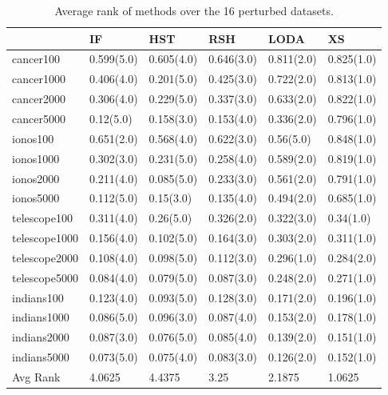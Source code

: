 \documentclass[11pt,onecolumn]{article}
\begin{document}
\begin{table}
\centering
    \begin{tabular}{llllll}
    \toprule
                  & IF         & HST        & RSH        & LODA       & XS          \\	\hline
    cancer100     & 0.599(5.0) & 0.605(4.0) & 0.646(3.0) & 0.811(2.0) & 0.825(1.0) \\
    cancer1000    & 0.406(4.0) & 0.201(5.0) & 0.425(3.0) & 0.722(2.0) & 0.813(1.0)  \\
    cancer2000    & 0.306(4.0) & 0.229(5.0) & 0.337(3.0) & 0.633(2.0) & 0.822(1.0) \\
    cancer5000    & 0.12(5.0)  & 0.158(3.0) & 0.153(4.0) & 0.336(2.0) & 0.796(1.0) \\
    ionos100      & 0.651(2.0) & 0.568(4.0) & 0.622(3.0) & 0.56(5.0)  & 0.848(1.0) \\
    ionos1000     & 0.302(3.0) & 0.231(5.0) & 0.258(4.0) & 0.589(2.0) & 0.819(1.0) \\
    ionos2000     & 0.211(4.0) & 0.085(5.0) & 0.233(3.0) & 0.561(2.0) & 0.791(1.0) \\
    ionos5000     & 0.112(5.0) & 0.15(3.0)  & 0.135(4.0) & 0.494(2.0) & 0.685(1.0) \\
    telescope100  & 0.311(4.0) & 0.26(5.0)  & 0.326(2.0) & 0.322(3.0) & 0.34(1.0) \\
    telescope1000 & 0.156(4.0) & 0.102(5.0) & 0.164(3.0) & 0.303(2.0) & 0.311(1.0) \\
    telescope2000 & 0.108(4.0) & 0.098(5.0) & 0.112(3.0) & 0.296(1.0) & 0.284(2.0)  \\
    telescope5000 & 0.084(4.0) & 0.079(5.0) & 0.087(3.0) & 0.248(2.0) & 0.271(1.0) \\
    indians100    & 0.123(4.0) & 0.093(5.0) & 0.128(3.0) & 0.171(2.0) & 0.196(1.0) \\
    indians1000   & 0.086(5.0) & 0.096(3.0) & 0.087(4.0) & 0.153(2.0) & 0.178(1.0) \\
    indians2000   & 0.087(3.0) & 0.076(5.0) & 0.085(4.0) & 0.139(2.0) & 0.151(1.0) \\
    indians5000   & 0.073(5.0) & 0.075(4.0) & 0.083(3.0) & 0.126(2.0) & 0.152(1.0) \\
    \midrule
    Avg Rank      & 4.0625     & 4.4375     & 3.25       & 2.1875     & 1.0625      \\
    \bottomrule
    \end{tabular}
    \caption{Average rank of methods over the 16 perturbed datasets.}
    \label{table:LowDimRanks}
\end{table}
\end{document}
